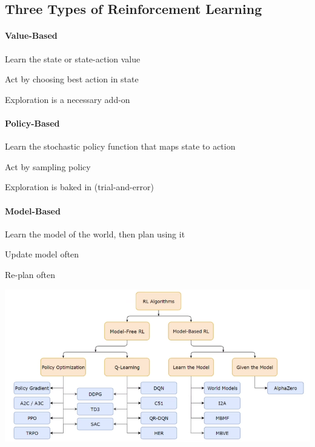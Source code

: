\documentclass[10pt]{report}
\begin{document}
\subsection{Three Types of Reinforcement Learning} \begin{multicols}{3}
\paragraph{Value-Based} \begin{list}{}{}
	\item Learn the state or state-action value
	\item Act by choosing best action in state
	\item Exploration is a necessary add-on
\end{list}
\paragraph{Policy-Based} \begin{list}{}{}
	\item Learn the stochastic policy function that maps state to action
	\item Act by sampling policy
	\item Exploration is baked in (trial-and-error)
\end{list}
\paragraph{Model-Based} \begin{list}{}{}
	\item Learn the model of the world, then plan using it
	\item Update model often
	\item Re-plan often
\end{list}
\end{multicols}
\begin{center}
	\includegraphics[scale=0.5]{190.png}
\end{center}
\end{document}
